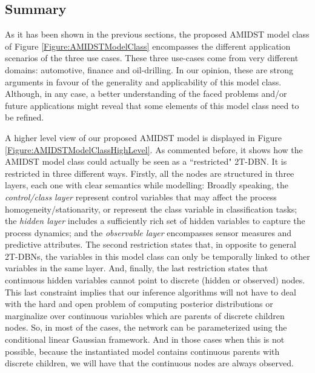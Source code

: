 \subsection{Summary}\label{summaryAMIDSTModels}

As it has been shown in the previous sections, the proposed AMIDST model class of Figure \ref{Figure:AMIDSTModelClass} encompasses the different application scenarios of the three use cases. These three use-cases come from very different domains: automotive, finance and oil-drilling. In our opinion, these are strong arguments in favour of the generality and applicability of this model class. Although, in any case, a better understanding of the faced problems and/or future applications might reveal that some elements of this model class need to be refined.  

A higher level view of our proposed AMIDST model is displayed in Figure \ref{Figure:AMIDSTModelClassHighLevel}. As commented before, it shows how the AMIDST model class could actually be seen as a ``restricted" 2T-DBN. It is restricted in three different ways. Firstly, all the nodes are structured in three layers, each one with clear semantics while modelling: Broadly speaking, the \textit{control/class layer} represent control variables that may affect the process homogeneity/stationarity, or represent the class variable in classification tasks; the \textit{hidden layer} includes a sufficiently rich set of hidden variables to capture the process dynamics; and the \textit{observable layer} encompasses sensor measures and predictive attributes. The second restriction states that, in opposite to general 2T-DBNs, the variables in this model class can only be temporally linked to other variables in the same layer. And, finally, the last restriction  states that continuous hidden variables cannot point to discrete (hidden or observed) nodes. This last constraint implies that our inference algorithms will not have to deal with the hard and open problem of computing posterior distributions or marginalize over continuous variables which are parents of discrete children nodes. So, in most of the cases, the network can be parameterized using the conditional linear Gaussian framework. And in those cases when this is not possible, because the instantiated model contains continuous parents with discrete children, we will have that the continuous nodes are always observed. 

